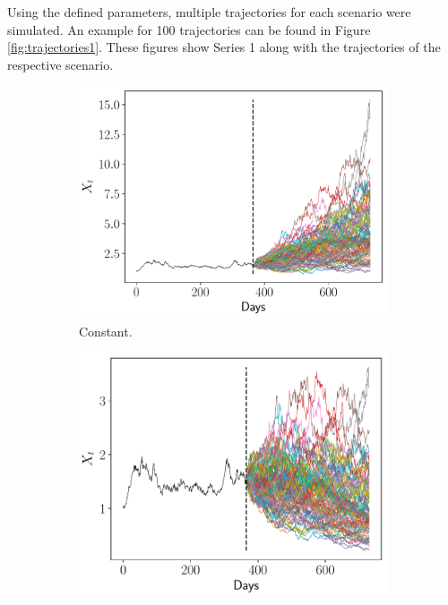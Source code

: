 \documentclass[11pt]{article}
\theoremstyle{definition}
\theoremstyle{remark}
\theoremstyle{remark}
\begin{document}
Using the defined parameters, multiple trajectories for each scenario
were simulated. An example for 100 trajectories can be found in Figure
\ref{fig:trajectories1}. These figures show Series 1 along with the
trajectories of the respective scenario.

\begin{figure}
  \centering
  \begin{subfigure}[b]{0.45\textwidth}
      \centering
      \includegraphics[scale=0.45]{pronostico-constante.pdf}
      \caption{Constant.}
  \end{subfigure}
  \begin{subfigure}[b]{0.45\textwidth}
      \centering
      \includegraphics[scale=0.45]{pronostico-pesimista.pdf}

\end{subfigure}
\end{figure}
\end{document}
